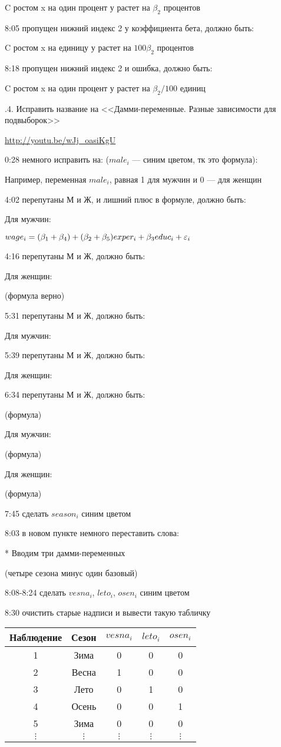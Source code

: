 \documentclass[12pt,a4paper]{article}
\begin{document}
C ростом x на один процент у растет на $\beta_2$ процентов

8:05 пропущен нижний индекс 2 у коэффициента бета, должно быть:

C ростом x на единицу у растет на $100\beta_2$ процентов

8:18 пропущен нижний индекс 2 и ошибка, должно быть:

C ростом x на один процент у растет на $\beta_2/100$ единиц


.4. Исправить название на <<Дамми-переменные. Разные зависимости для подвыборок>>

\url{http://youtu.be/wJj_oasiKgU}

0:28 немного исправить на: ($male_i$ --- синим цветом, тк это формула):

Например, переменная $male_i$, равная 1 для мужчин и 0 --- для женщин

4:02 перепутаны М и Ж, и лишний плюс в формуле, должно быть:

Для мужчин:

$wage_i=(\beta_1+\beta_4) + (\beta_2+\beta_5)exper_i+\beta_3 educ_i +\varepsilon_i$

4:16 перепутаны М и Ж, должно быть:

Для женщин:

(формула верно)

5:31 перепутаны М и Ж, должно быть:

Для мужчин:

5:39 перепутаны М и Ж, должно быть:

Для женщин:

6:34 перепутаны М и Ж, должно быть:

(формула)

Для мужчин: 

(формула)

Для женщин:

(формула)

7:45 сделать $season_i$ синим цветом 

8:03 в новом пункте немного переставить слова:

* Вводим три дамми-переменных

(четыре сезона минус один базовый)

8:08-8:24 сделать $vesna_i$, $leto_i$, $osen_i$ синим цветом 

8:30 очистить старые надписи и вывести такую табличку 

\begin{tabular}{ccccc}
\hline 
Наблюдение & Сезон & $vesna_i$ & $leto_i$ & $osen_i$  \\ 
\hline 
1 & Зима & 0 & 0 & 0 \\ 
2 & Весна & 1 & 0 & 0 \\ 
3 & Лето & 0 & 1 & 0 \\ 
4 & Осень & 0 & 0 & 1 \\ 
5 & Зима & 0 & 0 & 0 \\ 
$\vdots$ & $\vdots$ & $\vdots$ & $\vdots$ & $\vdots$ \\ 
\hline 
\end{tabular} 
\end{document}
